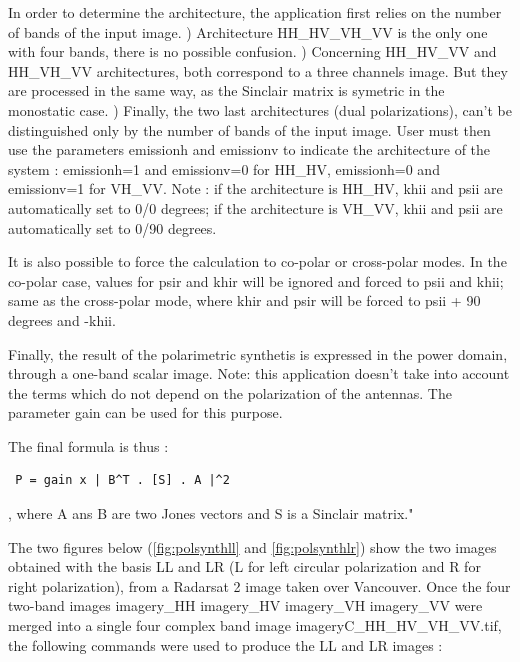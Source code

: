 {In order to determine the architecture, the application first relies on the number of bands of the input image. ) Architecture HH\_HV\_VH\_VV is the only one with four bands, there is no possible confusion. ) Concerning HH\_HV\_VV and HH\_VH\_VV architectures, both correspond to a three channels image. But they are processed in the same way, as the Sinclair matrix is symetric in the monostatic case. ) Finally, the two last architectures (dual polarizations), can't be distinguished only by the number of bands of the input image. User must then use the parameters emissionh and emissionv to indicate the architecture of the system : emissionh=1 and emissionv=0 for HH\_HV,  emissionh=0 and emissionv=1 for VH\_VV. \newline
Note : if the architecture is HH\_HV, khii and psii are automatically set to 0/0 degrees; if the architecture is VH\_VV, khii and psii are automatically set to 0/90 degrees.

It is also possible to force the calculation to co-polar or cross-polar modes.
In the co-polar case, values for psir and khir will be ignored and forced to psii and khii; same as the cross-polar mode, where khir and psir will be forced to psii + 90 degrees and -khii.

Finally, the result of the polarimetric synthetis is expressed in the power domain, through a one-band scalar image. \newline
Note: this application doesn't take into account the terms which do not depend on the polarization of the antennas. 
The parameter gain can be used for this purpose. \newline

 
The final formula is thus : \begin{verbatim} P = gain x | B^T . [S] . A |^2 \end{verbatim}, where A ans B are two Jones vectors and S is a Sinclair matrix."

 \newline
 
The two figures below (\ref{fig:polsynthll} and \ref{fig:polsynthlr}) show the two images obtained with the basis LL and LR (L for left circular polarization and R for right polarization),
from a Radarsat 2 image taken over Vancouver. Once the four two-band images imagery\_HH imagery\_HV imagery\_VH imagery\_VV were merged 
into a single four complex band image imageryC\_HH\_HV\_VH\_VV.tif, the following commands were used to produce the LL and LR images :

}
